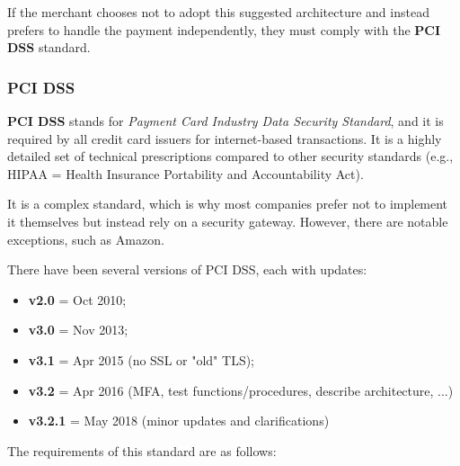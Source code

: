 If the merchant chooses not to adopt this suggested architecture and instead prefers to handle the payment independently, they must comply with the \textbf{PCI DSS} standard.


\subsubsection{PCI DSS}
\textbf{PCI DSS} stands for \textit{Payment Card Industry Data Security Standard}, and it is required by all credit card issuers for internet-based transactions. It is a highly detailed set of technical prescriptions compared to other security standards (e.g., HIPAA = Health Insurance Portability and Accountability Act).

It is a complex standard, which is why most companies prefer not to implement it themselves but instead rely on a security gateway. However, there are notable exceptions, such as Amazon.

There have been several versions of PCI DSS, each with updates:
\begin{itemize}
    \item \textbf{v2.0} = Oct 2010;
    \item \textbf{v3.0} = Nov 2013;
    \item \textbf{v3.1} = Apr 2015 (no SSL or "old" TLS);
    \item \textbf{v3.2} = Apr 2016 (MFA, test functions/procedures, describe architecture, ...)
    \item \textbf{v3.2.1} = May 2018 (minor updates and clarifications)
\end{itemize}

The requirements of this standard are as follows:

